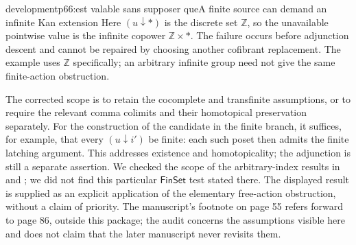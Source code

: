 \begin{dcomment}{development}{p66:est valable sans supposer que}{A finite source can demand an infinite Kan extension}
Here $(u\downarrow *)$ is the discrete set $\mathbb Z$, so the unavailable pointwise value is the infinite copower $\mathbb Z\times *$. The failure occurs before adjunction descent and cannot be repaired by choosing another cofibrant replacement. The example uses $\mathbb Z$ specifically; an arbitrary infinite group need not give the same finite-action obstruction.

The corrected scope is to retain the cocomplete and transfinite assumptions, or to require the relevant comma colimits and their homotopical preservation separately. For the construction of the candidate in the finite branch, it suffices, for example, that every $(u\downarrow i')$ be finite: each such poset then admits the finite latching argument. This addresses existence and homotopicality; the adjunction is still a separate assertion. We checked the scope of the arbitrary-index results in \citet[\S9.6]{RadulescuBanu2009} and \citet[\S2]{Cisinski2010}; we did not find this particular $\mathsf{FinSet}$ test stated there. The displayed result is supplied as an explicit application of the elementary free-action obstruction, without a claim of priority. The manuscript's footnote on page 55 refers forward to page 86, outside this package; the audit concerns the assumptions visible here and does not claim that the later manuscript never revisits them.
\end{dcomment}

